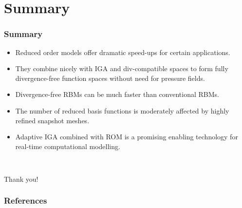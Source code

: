 \documentclass{beamer}
\begin{document}
\section{Summary}

\begin{frame}
  \frametitle{Summary}
  \begin{itemize}
  \item Reduced order models offer dramatic speed-ups for certain applications.
  \item They combine nicely with IGA and div-compatible spaces to form fully
    divergence-free function spaces without need for pressure fields.
  \item Divergence-free RBMs can be much faster than conventional RBMs.
  \item The number of reduced basis functions is moderately affected by highly refined snapshot
    meshes.
  \item Adaptive IGA combined with ROM is a promising enabling technology for real-time
    computational modelling.
  \end{itemize}
  ~\\ \begin{center} Thank you! \end{center}
\end{frame}

\begin{frame}
  \frametitle{References}

  \printbibliography
\end{frame}
\end{document}
